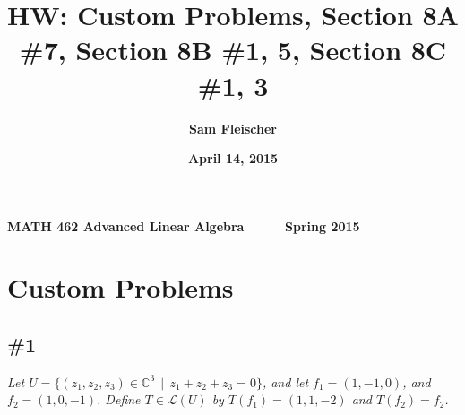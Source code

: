 \documentclass[12pt]{article}
\title{\bf HW: Custom Problems, Section 8A \#7, Section 8B \#1, 5, Section 8C \#1, 3}
\author{\bf Sam Fleischer}
\date{\bf April 14, 2015}
\newcommand{\suchthat}{\, \mid \,}
\begin{document}
{\bf MATH 462 \hfill Advanced Linear Algebra \ \ \ \ \ \hfill Spring 2015} 

{\let\newpage\relax\maketitle}

\section*{Custom Problems}
\subsection*{\#1}
{\it Let $U=\{(z_1, z_2, z_3) \in \mathbb{C}^3 \suchthat z_1 + z_2 + z_3 = 0\}$, and let $f_1 = (1, -1, 0)$, and $f_2 = (1, 0, -1)$.  Define $T\in \mathcal{L}(U)$ by $T(f_1) = (1, 1, -2)$ and $T(f_2) = f_2$.}
\end{document}
